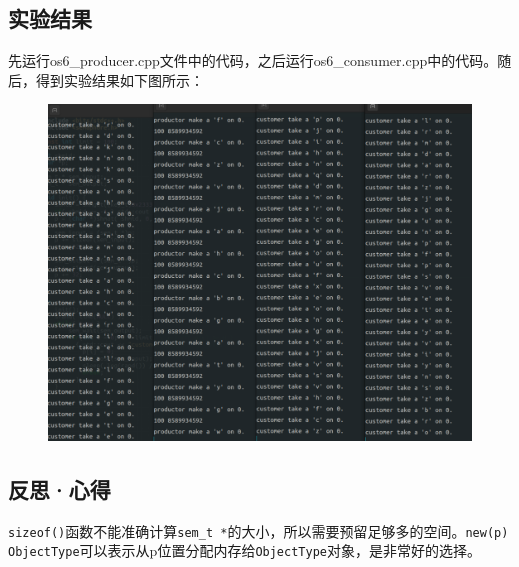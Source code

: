 \documentclass[UTF8]{ctexart}
\begin{document}
\subsection{实验结果}
先运行os6\_producer.cpp文件中的代码，之后运行os6\_consumer.cpp中的代码。随后，得到实验结果如下图所示：
\begin{figure}[htbp]
	\begin{center}
		\includegraphics[width=0.8\pdfpagewidth]{os6.png}
	\end{center}
\end{figure}
\subsection{反思·心得}
\texttt{sizeof()}函数不能准确计算\texttt{sem\_t *}的大小，所以需要预留足够多的空间。\texttt{new(p) ObjectType}可以表示从p位置分配内存给\texttt{ObjectType}对象，是非常好的选择。
\end{document}
